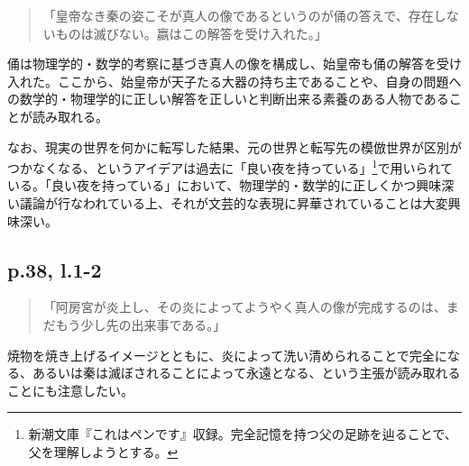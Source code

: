\documentclass[10pt, a5paper, twoside]{jsarticle}
\theoremstyle{definition}
\begin{document}
		\begin{quote}
			
			「皇帝なき秦の姿こそが真人の像であるというのが俑の答えで、存在しないものは滅びない。嬴はこの解答を受け入れた。」

		\end{quote}

		俑は物理学的・数学的考察に基づき真人の像を構成し、始皇帝も俑の解答を受け入れた。ここから、始皇帝が天子たる大器の持ち主であることや、自身の問題への数学的・物理学的に正しい解答を正しいと判断出来る素養のある人物であることが読み取れる。

		なお、現実の世界を何かに転写した結果、元の世界と転写先の模倣世界が区別がつかなくなる、というアイデアは過去に「良い夜を持っている」\footnote{新潮文庫『これはペンです』収録。完全記憶を持つ父の足跡を辿ることで、父を理解しようとする。}で用いられている。「良い夜を持っている」において、物理学的・数学的に正しくかつ興味深い議論が行なわれている上、それが文芸的な表現に昇華されていることは大変興味深い。

		\subsection{p.38, l.1-2}

		\begin{quote}

			「阿房宮が炎上し、その炎によってようやく真人の像が完成するのは、まだもう少し先の出来事である。」

		\end{quote}

		焼物を焼き上げるイメージとともに、炎によって洗い清められることで完全になる、あるいは秦は滅ぼされることによって永遠となる、という主張が読み取れることにも注意したい。
\end{document}

